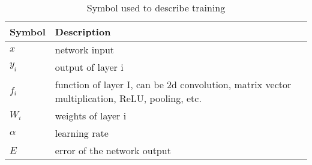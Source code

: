\begin{table}[htbp]
    \centering
    \caption{Symbol used to describe training}
      \begin{tabular}{lp{}} \hline
      Symbol   & Description \\ \hline
      $x$      & network input \\
      $y_i$    & output of layer i \\
      $f_i$    & function of layer I, can be 2d convolution, matrix vector multiplication, ReLU, pooling, etc. \\
      $W_i$    & weights of layer i \\
      $\alpha$ & learning rate \\
      $E$      & error of the network output \\ \hline
      \end{tabular}%
    \label{tab:symbol}%
  \end{table}%